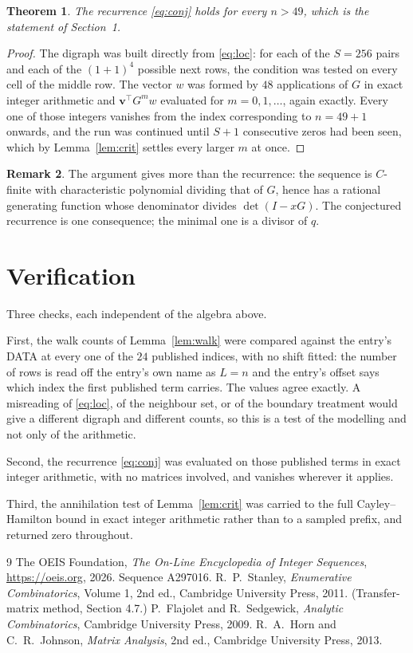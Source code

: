 \documentclass[11pt,a4paper]{article}
\theoremstyle{plain}
\newtheorem{theorem}{Theorem}
\theoremstyle{definition}
\newtheorem{remark}[theorem]{Remark}
\begin{document}
\begin{theorem}
The recurrence \eqref{eq:conj} holds for every $n>49$, which is the statement of
Section~1.
\end{theorem}

\begin{proof}
The digraph was built directly from \eqref{eq:loc}: for each of the $S=256$ pairs and each
of the $(1+1)^{4}$ possible next rows, the condition was tested on every cell of
the middle row. The vector $w$ was formed by $48$ applications of $G$ in exact integer
arithmetic and $\mathbf{v}^{\!\top}G^{m}w$ evaluated for $m=0,1,\dots$, again exactly.
Every one of those integers vanishes from the index corresponding to $n=49+1$ onwards,
and the run was continued until $S+1$ consecutive zeros had been seen, which by
Lemma~\ref{lem:crit} settles every larger $m$ at once.
\end{proof}

\begin{remark}
The argument gives more than the recurrence: the sequence is $C$-finite with characteristic
polynomial dividing that of $G$, hence has a rational generating function whose denominator
divides $\det(I-xG)$. The conjectured recurrence is one consequence; the minimal one is a
divisor of $q$.
\end{remark}

\section{Verification}

Three checks, each independent of the algebra above.

First, the walk counts of Lemma~\ref{lem:walk} were compared against the entry's DATA at
every one of the $24$ published indices, with no shift fitted: the number of rows is
read off the entry's own name as $L=n$ and the entry's offset says which index the first
published term carries. The values agree exactly. A misreading of \eqref{eq:loc}, of the
neighbour set, or of the boundary treatment would give a different digraph and different
counts, so this is a test of the modelling and not only of the arithmetic.

Second, the recurrence \eqref{eq:conj} was evaluated on those published terms in exact
integer arithmetic, with no matrices involved, and vanishes wherever it applies.

Third, the annihilation test of Lemma~\ref{lem:crit} was carried to the full
Cayley--Hamilton bound in exact integer arithmetic rather than to a sampled prefix, and
returned zero throughout.

\begin{thebibliography}{9}
 The OEIS Foundation, \emph{The On-Line Encyclopedia of Integer
Sequences}, \url{https://oeis.org}, 2026. Sequence A297016.
 R.~P.~Stanley, \emph{Enumerative Combinatorics}, Volume 1, 2nd ed.,
Cambridge University Press, 2011. (Transfer-matrix method, Section 4.7.)
 P.~Flajolet and R.~Sedgewick, \emph{Analytic Combinatorics}, Cambridge
University Press, 2009.
 R.~A.~Horn and C.~R.~Johnson, \emph{Matrix Analysis}, 2nd ed., Cambridge
University Press, 2013.
\end{thebibliography}
\end{document}
